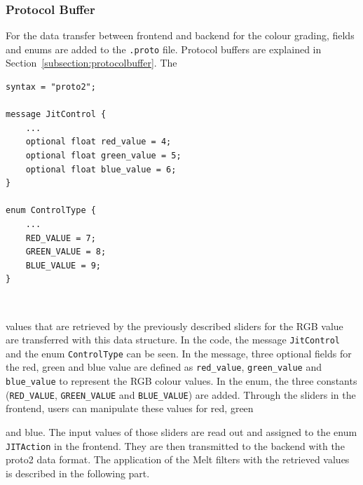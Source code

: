 \documentclass[../MasterThesis.tex]{subfiles}
\begin{document}
\subsubsection*{Protocol Buffer}

For the data transfer between frontend and backend for the colour grading, fields and enums are added to the \texttt{.proto} file. Protocol buffers are explained in Section~\ref{subsection:protocolbuffer}. The 
%
\begin{minipage}{0.54\textwidth}
\vspace*{-0.2em}
\begin{lstlisting}[style=protobufStyle, numbers=none]
syntax = "proto2";
	
message JitControl {
	...
	optional float red_value = 4;  
	optional float green_value = 5; 
	optional float blue_value = 6; 
}
	
enum ControlType {
	...
	RED_VALUE = 7;
	GREEN_VALUE = 8;
	BLUE_VALUE = 9;
}
\end{lstlisting}
\hfill
\end{minipage}\begin{minipage}{0.04\textwidth}
	\ 
\end{minipage}\begin{minipage}{0.42\textwidth}
\vspace*{0.6em}
values that are retrieved by the previously described sliders for the RGB value are transferred with this data structure.
In the code, the message \texttt{JitControl} and the enum \texttt{ControlType} can be seen. 
In the message, three optional fields for the red, green and blue value are defined as \texttt{red\_value}, \texttt{green\_value} and \texttt{blue\_value} to represent the RGB colour values. 
In the enum, the three constants (\texttt{RED\_VALUE}, \texttt{GREEN\_VALUE} and \texttt{BLUE\_VALUE}) are added. 
Through the sliders in the frontend, users can manipulate these values for red, green

\end{minipage}

and blue. The input values of those sliders are read out and assigned to the enum \texttt{JITAction} in the frontend. They are then transmitted to the backend with the proto2 data format. The application of the Melt filters with the retrieved values is described in the following part.
\end{document}
